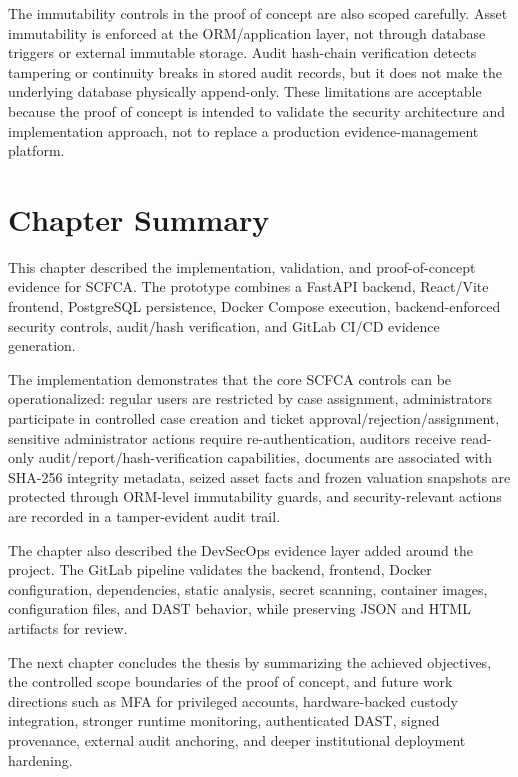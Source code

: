 \documentclass[12pt,a4paper]{report}
\begin{document}
The immutability controls in the proof of concept are also scoped carefully. Asset immutability is enforced at the ORM/application layer, not through database triggers or external immutable storage. Audit hash-chain verification detects tampering or continuity breaks in stored audit records, but it does not make the underlying database physically append-only. These limitations are acceptable because the proof of concept is intended to validate the security architecture and implementation approach, not to replace a production evidence-management platform.

\section{Chapter Summary}

This chapter described the implementation, validation, and proof-of-concept evidence for SCFCA. The prototype combines a FastAPI backend, React/Vite frontend, PostgreSQL persistence, Docker Compose execution, backend-enforced security controls, audit/hash verification, and GitLab CI/CD evidence generation.

The implementation demonstrates that the core SCFCA controls can be operationalized: regular users are restricted by case assignment, administrators participate in controlled case creation and ticket approval/rejection/assignment, sensitive administrator actions require re-authentication, auditors receive read-only audit/report/hash-verification capabilities, documents are associated with SHA-256 integrity metadata, seized asset facts and frozen valuation snapshots are protected through ORM-level immutability guards, and security-relevant actions are recorded in a tamper-evident audit trail.

The chapter also described the DevSecOps evidence layer added around the project. The GitLab pipeline validates the backend, frontend, Docker configuration, dependencies, static analysis, secret scanning, container images, configuration files, and DAST behavior, while preserving JSON and HTML artifacts for review.

The next chapter concludes the thesis by summarizing the achieved objectives, the controlled scope boundaries of the proof of concept, and future work directions such as MFA for privileged accounts, hardware-backed custody integration, stronger runtime monitoring, authenticated DAST, signed provenance, external audit anchoring, and deeper institutional deployment hardening.

\end{document}
